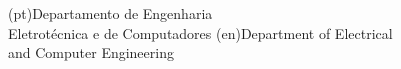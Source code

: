 



\ntdepartment(pt){Departamento de Engenharia\\Eletrotécnica e de Computadores}
\ntdepartment(en){Department of Electrical\\and Computer Engineering}









